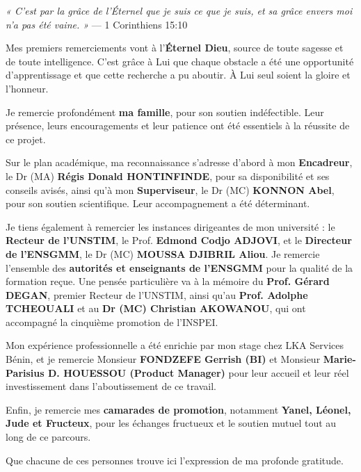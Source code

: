 
\noindent
\textit{« C'est par la grâce de l'Éternel que je suis ce que je suis, et sa grâce envers moi n'a pas été vaine. »} — 1 Corinthiens 15:10

\vspace{0.3cm}

\noindent
Mes premiers remerciements vont à l'\textbf{Éternel Dieu}, source de toute sagesse et de toute intelligence. C'est grâce à Lui que chaque obstacle a été une opportunité d'apprentissage et que cette recherche a pu aboutir. À Lui seul soient la gloire et l'honneur.

\vspace{0.3cm}

\noindent
Je remercie profondément \textbf{ma famille},  pour son soutien indéfectible. Leur présence, leurs encouragements et leur patience ont été essentiels à la réussite de ce projet.

\vspace{0.3cm}

\noindent
Sur le plan académique, ma reconnaissance s'adresse d'abord à mon \textbf{Encadreur}, le Dr (MA) \textbf{Régis Donald HONTINFINDE}, pour sa disponibilité et ses conseils avisés, ainsi qu'à mon \textbf{Superviseur}, le Dr (MC) \textbf{KONNON Abel}, pour son soutien scientifique. Leur accompagnement a été déterminant.

\vspace{0.3cm}

\noindent
Je tiens également à remercier les instances dirigeantes de mon université : le \textbf{Recteur de l'UNSTIM}, le Prof. \textbf{Edmond Codjo ADJOVI}, et le \textbf{Directeur de l'ENSGMM}, le Dr (MC) \textbf{MOUSSA DJIBRIL Aliou}. Je remercie l'ensemble des \textbf{autorités et enseignants de l'ENSGMM} pour la qualité de la formation reçue. Une pensée particulière va à la mémoire du \textbf{Prof. Gérard DEGAN}, premier Recteur de l'UNSTIM, ainsi qu'au \textbf{Prof. Adolphe TCHEOUALI} et au \textbf{Dr (MC) Christian AKOWANOU}, qui ont accompagné la cinquième promotion de l'INSPEI.

\vspace{0.3cm}

\noindent
Mon expérience professionnelle a été enrichie par mon stage chez LKA Services Bénin, et je remercie Monsieur \textbf{FONDZEFE Gerrish (BI)} et Monsieur \textbf{Marie-Parisius D. HOUESSOU (Product Manager)} pour leur accueil et leur réel investissement dans l'aboutissement de ce travail.

\vspace{0.3cm}

\noindent
Enfin, je remercie mes \textbf{camarades de promotion}, notamment \textbf{Yanel, Léonel, Jude et Fructeux}, pour les échanges fructueux et le soutien mutuel tout au long de ce parcours.

\vspace{0.3cm}

\noindent
Que chacune de ces personnes trouve ici l'expression de ma profonde gratitude.
